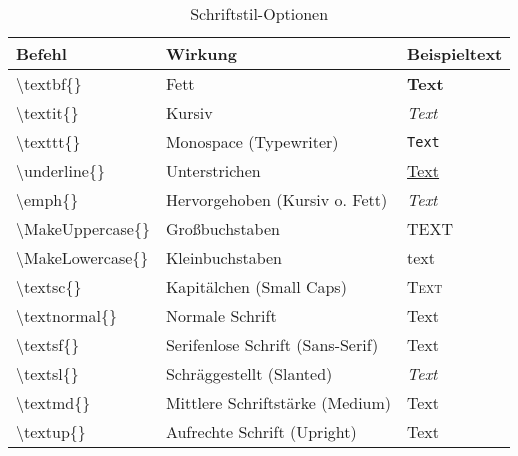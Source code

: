 \begin{table}[H]
    \centering
    \begin{tabular}{lll}
        \toprule
        \textbf{Befehl}                  & \textbf{Wirkung}                 & \textbf{Beispieltext} \\
        \midrule
        \textbackslash textbf\{\}        & Fett                             & \textbf{Text}         \\
        \textbackslash textit\{\}        & Kursiv                           & \textit{Text}         \\
        \textbackslash texttt\{\}        & Monospace (Typewriter)           & \texttt{Text}         \\
        \textbackslash underline\{\}     & Unterstrichen                    & \underline{Text}      \\
        \textbackslash emph\{\}          & Hervorgehoben (Kursiv o. Fett)   & \emph{Text}           \\
        \textbackslash MakeUppercase\{\} & Großbuchstaben                   & \MakeUppercase{Text}  \\
        \textbackslash MakeLowercase\{\} & Kleinbuchstaben                  & \MakeLowercase{Text}  \\
        \textbackslash textsc\{\}        & Kapitälchen (Small Caps)         & \textsc{Text}         \\
        \textbackslash textnormal\{\}    & Normale Schrift                  & \textnormal{Text}     \\
        \textbackslash textsf\{\}        & Serifenlose Schrift (Sans-Serif) & \textsf{Text}         \\
        \textbackslash textsl\{\}        & Schräggestellt (Slanted)         & \textsl{Text}         \\
        \textbackslash textmd\{\}        & Mittlere Schriftstärke (Medium)  & \textmd{Text}         \\
        \textbackslash textup\{\}        & Aufrechte Schrift (Upright)      & \textup{Text}         \\
        \bottomrule
    \end{tabular}
    \caption{Schriftstil-Optionen}
    \label{tab:schriftstile}
\end{table}